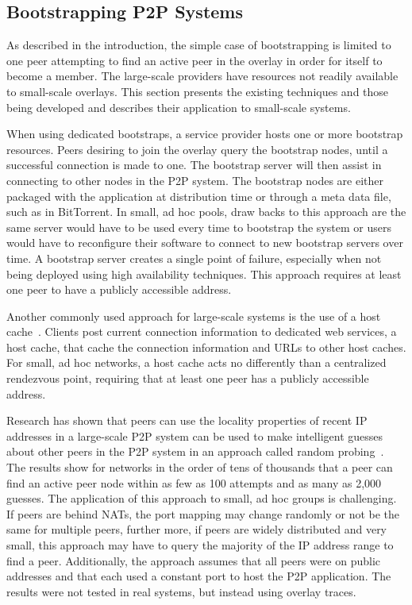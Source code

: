 \documentclass[conference]{IEEEtran}
\begin{document}
\subsection{Bootstrapping P2P Systems}

As described in the introduction, the simple case of bootstrapping is limited
to one peer attempting to find an active peer in the overlay in order for
itself to become a member.  The large-scale providers have resources not
readily available to small-scale overlays.  This section presents the existing
techniques and those being developed and describes their application to
small-scale systems.

When using dedicated bootstraps, a service provider hosts one or more bootstrap
resources.  Peers desiring to join the overlay query the bootstrap nodes, until
a successful connection is made to one.  The bootstrap server will then assist
in connecting to other nodes in the P2P system.  The bootstrap nodes are either
packaged with the application at distribution time or through a meta data file,
such as in BitTorrent.  In small, ad hoc pools, draw backs to this approach are
the same server would have to be used every time to bootstrap the system or
users would have to reconfigure their software to connect to new bootstrap
servers over time.  A bootstrap server creates a single point of failure,
especially when not being deployed using high availability techniques.  This
approach requires at least one peer to have a publicly accessible address.

Another commonly used approach for large-scale systems is the use of a host
cache~\cite{host_cache}.  Clients post current connection information to
dedicated web services, a host cache, that cache the connection information and
URLs to other host caches.  For small, ad hoc networks, a host cache acts no
differently than a centralized rendezvous point, requiring that at least one
peer has a publicly accessible address.

Research has shown that peers can use the locality properties of recent IP
addresses in a large-scale P2P system can be used to make intelligent guesses
about other peers in the P2P system in an approach called random
probing~\cite{bootstrapping_p2p, locality_aware}.  The results show for
networks in the order of tens of thousands that a peer can find an active peer
node within as few as 100 attempts and as many as 2,000 guesses.  The
application of this approach to small, ad hoc groups is challenging.  If peers
are behind NATs, the port mapping may change randomly or not be the same for
multiple peers, further more, if peers are widely distributed and very small,
this approach may have to query the majority of the IP address range to find a
peer.  Additionally, the approach assumes that all peers were on public
addresses and that each used a constant port to host the P2P application.  The
results were not tested in real systems, but instead using overlay traces.
\end{document}
